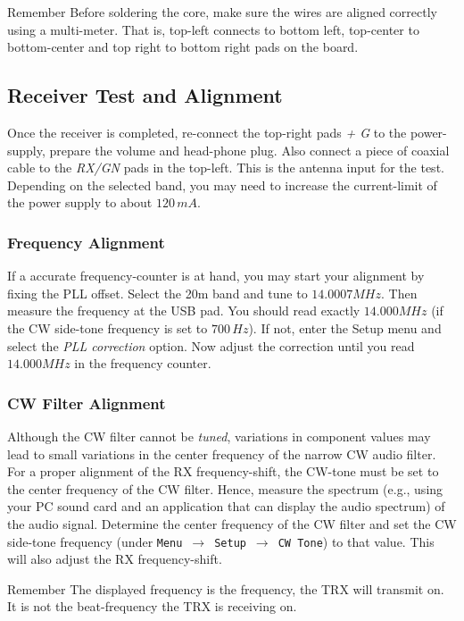 \documentclass[10pt, a4paper,twoside]{scrartcl}
\newenvironment{remember}{\begin{bclogo}[couleur=blue!30,arrondi=.1,logo=\bccrayon,ombre=true]{Remember}}{\end{bclogo}}
\begin{document}
\begin{remember}
Before soldering the core, make sure the wires are aligned correctly using a multi-meter. That is, top-left connects to bottom left, top-center to bottom-center and top right to bottom right pads on the board. 
\end{remember}

\subsection{Receiver Test and Alignment}
Once the receiver is completed, re-connect the top-right pads \emph{+ G} to the power-supply, prepare the volume and head-phone plug. Also connect a piece of coaxial cable to the \emph{RX/GN} pads in the top-left. This is the antenna input for the test. Depending on the selected band, you may need to increase the current-limit of the power supply to about $120\,mA$. 

\subsubsection{Frequency Alignment}
If a accurate frequency-counter is at hand, you may start your alignment by fixing the PLL offset. Select the 20m band and tune to $14.0007 MHz$. Then measure the frequency at the USB pad. You should read exactly $14.000 MHz$ (if the CW side-tone frequency is set to $700\,Hz$). If not, enter the Setup menu and select the \emph{PLL correction} option. Now adjust the correction until you read $14.000 MHz$ in the frequency counter.

\subsubsection{CW Filter Alignment}
Although the CW filter cannot be \emph{tuned}, variations in component values may lead to small variations in the center frequency of the narrow CW audio filter. For a proper alignment of the RX frequency-shift, the CW-tone must be set to the center frequency of the CW filter. Hence, measure the spectrum (e.g., using your PC sound card and an application that can display the audio spectrum) of the audio signal. Determine the center frequency of the CW filter and set the CW side-tone frequency (under \texttt{Menu}\ $\rightarrow$\ \texttt{Setup}\ $\rightarrow$\ \texttt{CW Tone}) to that value. This will also adjust the RX frequency-shift.

\begin{remember}
The displayed frequency is the frequency, the TRX will transmit on. It is not the beat-frequency the TRX is receiving on.
\end{remember}
\end{document}
